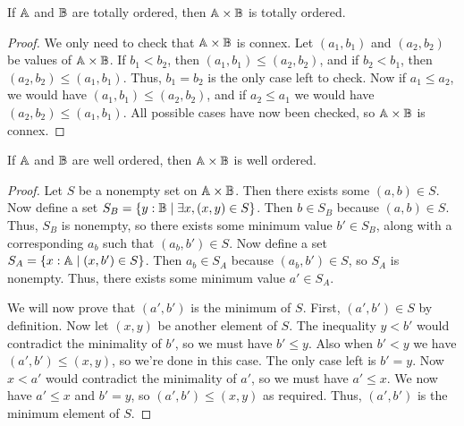 \documentclass[../../math.tex]{subfiles}
\begin{document}
\begin{theorem}
    If $\mathbb{A}$ and $\mathbb{B}$ are totally ordered, then $\mathbb{A} \times \mathbb{B}$ is totally
    ordered.
\end{theorem}
\begin{proof}
    We only need to check that $\mathbb{A} \times \mathbb{B}$ is connex.  Let $(a_1, b_1)$ and
    $(a_2, b_2)$ be values of $\mathbb{A} \times \mathbb{B}$.  If $b_1 < b_2$, then $(a_1, b_1)
    \leq (a_2, b_2)$, and if $b_2 < b_1$, then $(a_2, b_2) \leq (a_1, b_1)$.
    Thus, $b_1 = b_2$ is the only case left to check.  Now if $a_1 \leq a_2$, we
    would have $(a_1, b_1) \leq (a_2, b_2)$, and if $a_2 \leq a_1$ we would have
    $(a_2, b_2) \leq (a_1, b_1)$.  All possible cases have now been checked, so
    $\mathbb{A} \times \mathbb{B}$ is connex.
\end{proof}

\begin{theorem}
    If $\mathbb{A}$ and $\mathbb{B}$ are well ordered, then $\mathbb{A} \times \mathbb{B}$ is well ordered.
\end{theorem}
\begin{proof}
    Let $S$ be a nonempty set on $\mathbb{A} \times \mathbb{B}$.  Then there exists some $(a, b)
    \in S$.  Now define a set $S_B = \{y : \mathbb{B} \mid \exists x, (x, y) \in
    S\}$.  Then $b \in S_B$ because $(a, b) \in S$.  Thus, $S_B$ is nonempty, so
    there exists some minimum value $b' \in S_B$, along with a corresponding
    $a_b$ such that $(a_b, b') \in S$.  Now define a set $S_A = \{x : \mathbb{A} \mid
    (x, b') \in S\}$.  Then $a_b \in S_A$ because $(a_b, b') \in S$, so $S_A$ is
    nonempty.  Thus, there exists some minimum value $a' \in S_A$.

    We will now prove that $(a', b')$ is the minimum of $S$.  First, $(a', b')
    \in S$ by definition.  Now let $(x, y)$ be another element of $S$.  The
    inequality $y < b'$ would contradict the minimality of $b'$, so we must have
    $b' \leq y$.  Also when $b' < y$ we have $(a', b') \leq (x, y)$, so we're
    done in this case.  The only case left is $b' = y$.  Now $x < a'$ would
    contradict the minimality of $a'$, so we must have $a' \leq x$.  We now have
    $a' \leq x$ and $b' = y$, so $(a', b') \leq (x, y)$ as required.  Thus,
    $(a', b')$ is the minimum element of $S$.
\end{proof}
\end{document}
